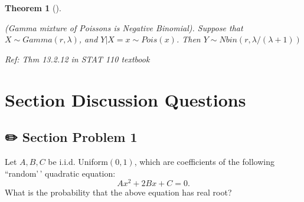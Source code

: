 \documentclass[
  letterpaper,
  DIV=11,
  numbers=noendperiod]{scrreprt}
\theoremstyle{plain}
\newtheorem{theorem}{Theorem}[chapter]
\theoremstyle{definition}
\theoremstyle{remark}
\begin{document}
\leavevmode{}%
\begin{theorem}[]\label{thm-mixture-poisson-negative-binomial}

(Gamma mixture of Poissons is Negative Binomial). Suppose that
\(X \sim Gamma(r, \lambda)\), and \(Y|X=x \sim Pois(x)\). Then
\(Y\sim Nbin(r, \lambda/(\lambda+1))\)

\emph{Ref: Thm 13.2.12 in STAT 110 textbook}

\end{theorem}

\hypertarget{section-discussion-questions}{%
\section*{Section Discussion
Questions}\label{section-discussion-questions}}


\hypertarget{section-problem-1-1}{%
\subsection*{✏️ Section Problem 1}\label{section-problem-1-1}}

Let \(A, B, C\) be i.i.d. Uniform\((0,1)\), which are coefficients of
the following ``random'\,' quadratic equation: \[
A x^2 + 2B x + C = 0.
\] What is the probability that the above equation has real root?
\end{document}
